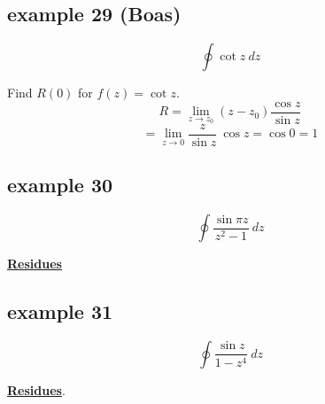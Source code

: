 \documentclass[11pt, oneside]{article}
\begin{document}
\subsection*{example 29 (Boas)}
\[ \oint \cot z \ dz \]

Find $R(0)$ for $f(z) = \cot z$.
\[ R = \lim_{z \rightarrow z_0} (z - z_0) \frac{\cos z}{\sin z} \]
\[ = \lim_{z \rightarrow 0} \frac{z}{\sin z} \ \cos z = \cos 0 = 1 \]

\subsection*{example 30}
\[ \oint \frac{\sin \pi z}{z^2 - 1} \ dz \]

\hyperref[sec:ex30R]{\textbf{Residues}}  

\subsection*{example 31}
\[ \oint \frac{\sin z}{1 - z^4} \ dz \]

\hyperref[sec:ex31R]{\textbf{Residues}}.
\end{document}
